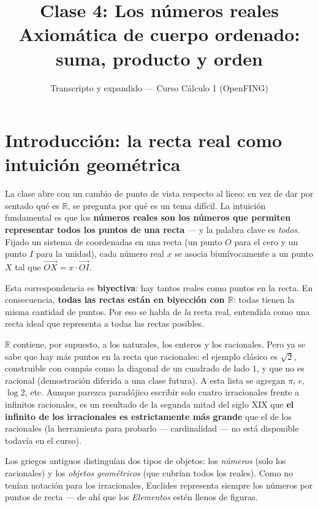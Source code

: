 \documentclass[12pt,a4paper]{article}
\title{\textbf{Clase 4: Los números reales} \\[0.3em]
        \large{Axiomática de cuerpo ordenado: suma, producto y orden}}
\author{Transcripto y expandido --- Curso Cálculo 1 (OpenFING)}
\date{}
\begin{document}
\maketitle
\thispagestyle{empty}
\newpage

\tableofcontents
\newpage

\section{Introducción: la recta real como intuición geométrica}

La clase abre con un cambio de punto de vista respecto al liceo: en vez de
dar por sentado qué es $\mathbb{R}$, se pregunta por qué es un tema difícil.
La intuición fundamental es que los \textbf{números reales son los números
que permiten representar todos los puntos de una recta} --- y la palabra
clave es \emph{todos}. Fijado un sistema de coordenadas en una recta (un
punto $O$ para el cero y un punto $I$ para la unidad), cada número real $x$
se asocia biunívocamente a un punto $X$ tal que $\vec{OX} = x \cdot
\vec{OI}$.

\begin{notebox}
Esta correspondencia es \textbf{biyectiva}: hay tantos reales como puntos en
la recta. En consecuencia, \textbf{todas las rectas están en biyección con
$\mathbb{R}$}: todas tienen la misma cantidad de puntos. Por eso se habla de
\emph{la} recta real, entendida como una recta ideal que representa a todas
las rectas posibles.
\end{notebox}

$\mathbb{R}$ contiene, por supuesto, a los naturales, los enteros y los
racionales. Pero ya se sabe que hay más puntos en la recta que racionales:
el ejemplo clásico es $\sqrt{2}$, construible con compás como la diagonal de
un cuadrado de lado $1$, y que no es racional (demostración diferida a una
clase futura). A esta lista se agregan $\pi$, $e$, $\log 2$, etc. Aunque
parezca paradójico escribir solo cuatro irracionales frente a infinitos
racionales, es un resultado de la segunda mitad del siglo XIX que
\textbf{el infinito de los irracionales es estrictamente más grande} que el
de los racionales (la herramienta para probarlo --- cardinalidad --- no está
disponible todavía en el curso).

\begin{notebox}
Los griegos antiguos distinguían dos tipos de objetos: los \emph{números}
(solo los racionales) y los \emph{objetos geométricos} (que cubrían todos
los reales). Como no tenían notación para los irracionales, Euclides
representa siempre los números por puntos de recta --- de ahí que los
\emph{Elementos} estén llenos de figuras.
\end{notebox}
\end{document}

